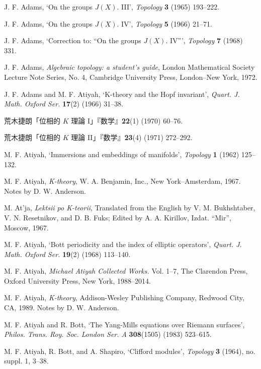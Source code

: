 \noindent [5] J. F. Adams, `On the groups $J(X)$. III', \textit{Topology} \textbf{3} (1965) 193--222.

\noindent [6] J. F. Adams, `On the groups $J(X)$. IV', \textit{Topology} \textbf{5} (1966) 21--71.

\noindent [7] J. F. Adams, `Correction to: ``On the groups $J(X)$. IV''', \textit{Topology} \textbf{7} (1968) 331.

\noindent [8] J. F. Adams, \textit{Algebraic topology: a student's guide}, London Mathematical Society Lecture Note Series, No. 4, Cambridge University Press, London--New York, 1972.

\noindent [9] J. F. Adams and M. F. Atiyah, `K-theory and the Hopf invariant', \textit{Quart. J. Math. Oxford Ser.} \textbf{17}(2) (1966) 31--38.

\noindent [10] 荒木捷朗「位相的 $K$ 理論 I」『数学』\textbf{22}(1) (1970) 60--76.

\noindent [11] 荒木捷朗「位相的 $K$ 理論 II」『数学』\textbf{23}(4) (1971) 272--292.

\noindent [12] M. F. Atiyah, `Immersions and embeddings of manifolds', \textit{Topology} \textbf{1} (1962) 125--132.

\noindent [13] M. F. Atiyah, \textit{K-theory}, W. A. Benjamin, Inc., New York--Amsterdam, 1967. Notes by D. W. Anderson.

\noindent [14] M. At'ja, \textit{Lektsii po K-teorii}, Translated from the English by V. M. Bukhshtaber, V. N. Resetnikov, and D. B. Fuks; Edited by A. A. Kirillov, Izdat. ``Mir'', Moscow, 1967.

\noindent [15] M. F. Atiyah, `Bott periodicity and the index of elliptic operators', \textit{Quart. J. Math. Oxford Ser.} \textbf{19}(2) (1968) 113--140.

\noindent [16] M. F. Atiyah, \textit{Michael Atiyah Collected Works.} Vol. 1--7, The Clarendon Press, Oxford University Press, New York, 1988--2014.

\noindent [17] M. F. Atiyah, \textit{K-theory}, Addison-Wesley Publishing Company, Redwood City, CA, 1989. Notes by D. W. Anderson.

\noindent [18] M. F. Atiyah and R. Bott, `The Yang-Mills equations over Riemann surfaces', \textit{Philos. Trans. Roy. Soc. London Ser. A} \textbf{308}(1505) (1983) 523--615.

\noindent [19] M. F. Atiyah, R. Bott, and A. Shapiro, `Clifford modules', \textit{Topology} \textbf{3} (1964), no. suppl. 1, 3--38.


